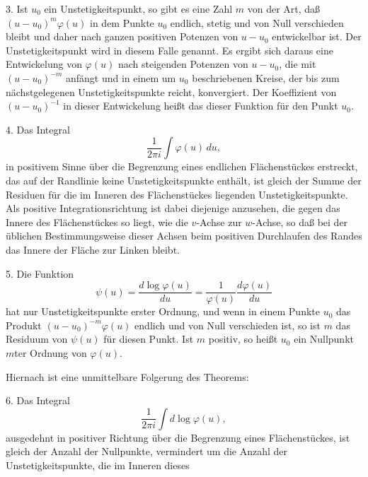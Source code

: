 
3. Ist $u_0$ ein Unstetigkeitspunkt, so gibt es eine  Zahl $m$ von der Art, daß $(u-u_0)^m\varphi(u)$ in dem Punkte $u_0$ endlich, stetig und von Null verschieden bleibt und daher nach ganzen positiven Potenzen von $u - u_0$ entwickelbar ist. Der Unstetigkeitspunkt wird in diesem Falle  genannt. Es ergibt sich daraus eine Entwickelung von $\varphi(u)$ nach steigenden Potenzen von $u - u_0$, die mit $(u-u_0)^{-m}$ anfängt und in einem um $u_0$ beschriebenen Kreise, der bis zum nächstgelegenen Unstetigkeitspunkte reicht, konvergiert. Der Koeffizient von $(u-u_0)^{-1}$ in dieser Entwickelung heißt das  dieser Funktion für den Punkt $u_0$.

4.  Das Integral
\[
\frac{1}{2\pi i}\int \varphi(u)\,du,
\]
in positivem Sinne über die Begrenzung eines endlichen Flächenstückes erstreckt, das auf der Randlinie keine Unstetigkeitspunkte enthält, ist gleich der Summe der Residuen für die im Inneren des Flächenstückes liegenden Unstetigkeitspunkte. Als positive Integrationsrichtung ist dabei diejenige anzusehen, die gegen das Innere des Flächenstückes so liegt, wie die $v$-Achse zur $w$-Achse, so daß bei der üblichen Bestimmungsweise dieser Achsen beim positiven Durchlaufen des Randes das Innere der Fläche zur Linken bleibt.

5. Die Funktion
\[
\psi(u) = \frac{d\log\varphi(u)}{du} = \frac{1}{\varphi(u)}\frac{d\varphi(u)}{du}
\]
hat nur Unstetigkeitspunkte erster Ordnung, und wenn in einem Punkte $u_0$ das Produkt $(u-u_0)^{-m}\varphi(u)$ endlich und von Null verschieden ist, so ist $m$ das Residuum von $\psi(u)$ für diesen Punkt. Ist $m$ positiv, so heißt $u_0$ ein Nullpunkt $m$ter Ordnung von $\varphi(u)$.

Hiernach ist eine unmittelbare Folgerung des  Theorems:

6. Das Integral
\[
\frac{1}{2\pi i}\int d\log\varphi(u),
\]
ausgedehnt in positiver Richtung über die Begrenzung eines Flächenstückes, ist gleich der Anzahl der Nullpunkte, vermindert um die Anzahl der Unstetigkeitspunkte, die im Inneren dieses
